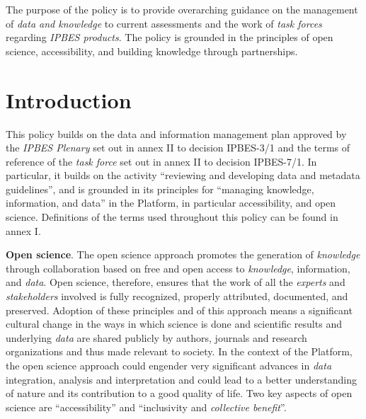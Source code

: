 \documentclass{article}
\begin{document}
The purpose of the policy is to provide overarching guidance on the management of \textit{data and knowledge }to current assessments and the work of \textit{task forces} regarding \textit{IPBES products}. The policy is grounded in the principles of open science, accessibility, and building knowledge through partnerships.

\section*{Introduction}

This policy builds on the data and information management plan approved by the \textit{IPBES Plenary} set out in annex II to decision IPBES-3/1 and the terms of reference of the \textit{task force} set out in annex II to decision IPBES-7/1. In particular, it builds on the activity “reviewing and developing data and metadata guidelines”, and is grounded in its principles for “managing knowledge, information, and data” in the Platform, in particular accessibility, and open science. Definitions of the terms used throughout this policy can be found in annex I.

\textbf{Open science}. The open science approach promotes the generation of \textit{knowledge }through collaboration based on free and open access to \textit{knowledge}, information, and \textit{data}. Open science, therefore, ensures that the work of all the \textit{experts} and \textit{stakeholders} involved is fully recognized, properly attributed, documented, and preserved. Adoption of these principles and of this approach means a significant cultural change in the ways in which science is done and scientific results and underlying \textit{data} are shared publicly by authors, journals and research organizations and thus made relevant to society. In the context of the Platform, the open science approach could engender very significant advances in \textit{data} integration, analysis and interpretation and could lead to a better understanding of nature and its contribution to a good quality of life. Two key aspects of open science are “accessibility” and “inclusivity and \textit{collective benefit}”.
\end{document}
